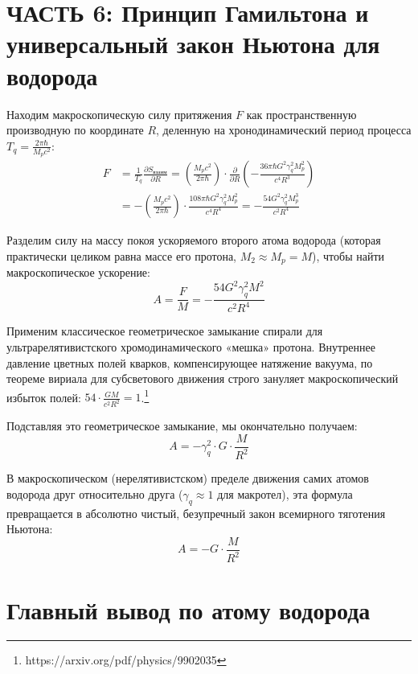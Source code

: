 \documentclass[12pt,a4paper]{article}
\begin{document}
\section*{ЧАСТЬ 6: Принцип Гамильтона и универсальный закон Ньютона для водорода}

Находим макроскопическую силу притяжения $F$ как пространственную производную по координате $R$, деленную на хронодинамический период процесса $T_q = \frac{2\pi \hbar}{M_p c^2}$:
\begin{align}
F &= \frac{1}{T_q} \frac{\partial S_{взаим}}{\partial R} = \left( \frac{M_p c^2}{2\pi \hbar} \right) \cdot \frac{\partial}{\partial R} \left( - \frac{36\pi \hbar G^2 \gamma_q^2 M_p^2}{c^4 R^3} \right) \\
&= - \left( \frac{M_p c^2}{2\pi \hbar} \right) \cdot \frac{108\pi \hbar G^2 \gamma_q^2 M_p^2}{c^4 R^4} = - \frac{54 G^2 \gamma_q^2 M_p^3}{c^2 R^4}
\end{align}

Разделим силу на массу покоя ускоряемого второго атома водорода (которая практически целиком равна массе его протона, $M_2 \approx M_p = M$), чтобы найти макроскопическое ускорение:
\begin{equation}
A = \frac{F}{M} = - \frac{54 G^2 \gamma_q^2 M^2}{c^2 R^4}
\end{equation}

Применим классическое геометрическое замыкание спирали для ультрарелятивистского хромодинамического «мешка» протона. Внутреннее давление цветных полей кварков, компенсирующее натяжение вакуума, по теореме вириала для субсветового движения строго зануляет макроскопический избыток полей: $54 \cdot \frac{G M}{c^2 R^2} = 1$.\footnote{https://arxiv.org/pdf/physics/9902035}

Подставляя это геометрическое замыкание, мы окончательно получаем:
\begin{equation}
A = - \gamma_q^2 \cdot G \cdot \frac{M}{R^2}
\end{equation}

В макроскопическом (нерелятивистском) пределе движения самих атомов водорода друг относительно друга ($\gamma_q \approx 1$ для макротел), эта формула превращается в абсолютно чистый, безупречный закон всемирного тяготения Ньютона:
\begin{equation}
A = - G \cdot \frac{M}{R^2}
\end{equation}

\section*{Главный вывод по атому водорода}
\end{document}
